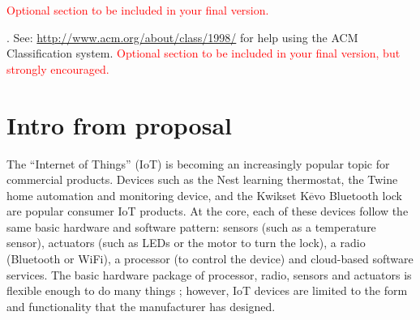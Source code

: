 \documentclass{chi-ext}
\title{\papertitle}
\author
{
  \alignauthor
	{
  	\textbf{First Author}\\
  	\affaddr{AuthorCo, Inc.}\\
  	\affaddr{123 Author Ave.}\\
  	\affaddr{Authortown, PA 54321 USA}\\
  	\email{author1@anotherco.com}
  }
  \vfil
  \alignauthor
	{
  	\textbf{Second Author}\\
  	\affaddr{AuthorCo, Inc.}\\
  	\affaddr{123 Author Ave.}\\
  	\affaddr{Authortown, PA 54321 USA}\\
  	\email{author2@anotherco.com}
  }
  \vfil
  \alignauthor
	{
  	\textbf{Third Author}\\
  	\affaddr{AuthorCo, Inc.}\\
  	\affaddr{123 Author Ave.}\\
  	\affaddr{Authortown, PA 54321 USA}\\
  	\email{author3@anotherco.com}
  }
}
\begin{document}
\maketitle

\begin{abstract}
\end{abstract}

\keywords{}
\textcolor{red}{Optional section to be included in your final version.}

. 
See: \url{http://www.acm.org/about/class/1998/} 
for help using the ACM Classification system.
\textcolor{red}{Optional section to be included in your final version, but strongly encouraged.}

\section{Intro from proposal}

	The ``Internet of Things'' (IoT) is becoming an increasingly
	popular topic for commercial products. Devices such as the Nest
	learning thermostat, the Twine home automation and monitoring
	device, and the Kwikset K$\overline{\mbox{e}}$vo Bluetooth lock are popular
	consumer IoT products. At the core, each of these devices follow the
	same basic hardware and software pattern: sensors (such as a
	temperature sensor), actuators (such as LEDs or the
	motor to turn the lock), a radio (Bluetooth or WiFi), a processor
	(to control the device) and cloud-based software services. The basic
	hardware package of processor, radio, sensors and actuators is
	flexible enough to do many things \cite{Lyons:2013jc}; however, IoT
	devices are limited to the form and functionality that the
	manufacturer has designed.
\end{document}
